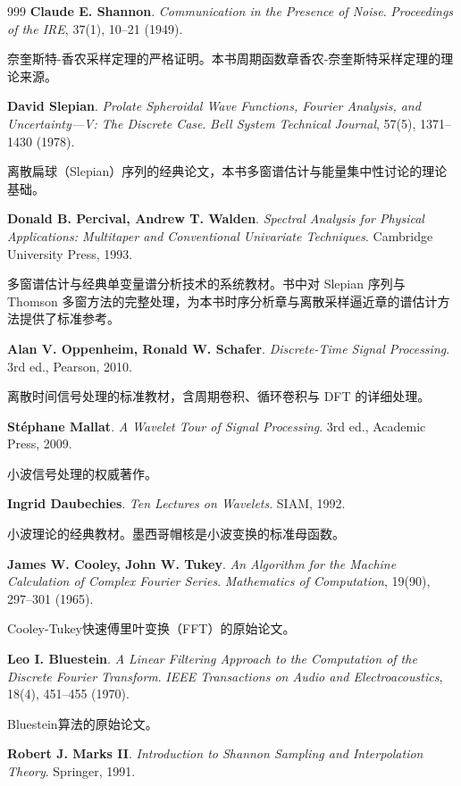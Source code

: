\begin{thebibliography}{999}
 \textbf{Claude E. Shannon}. \textit{Communication in the Presence of Noise}. \textit{Proceedings of the IRE}, 37(1), 10--21 (1949).

奈奎斯特-香农采样定理的严格证明。本书周期函数章香农-奈奎斯特采样定理的理论来源。

 \textbf{David Slepian}. \textit{Prolate Spheroidal Wave Functions, Fourier Analysis, and Uncertainty---V: The Discrete Case}. \textit{Bell System Technical Journal}, 57(5), 1371--1430 (1978).

离散扁球（Slepian）序列的经典论文，本书多窗谱估计与能量集中性讨论的理论基础。

 \textbf{Donald B. Percival, Andrew T. Walden}. \textit{Spectral Analysis for Physical Applications: Multitaper and Conventional Univariate Techniques}. Cambridge University Press, 1993.

多窗谱估计与经典单变量谱分析技术的系统教材。书中对 Slepian 序列与 Thomson 多窗方法的完整处理，为本书时序分析章与离散采样逼近章的谱估计方法提供了标准参考。

 \textbf{Alan V. Oppenheim, Ronald W. Schafer}. \textit{Discrete-Time Signal Processing}. 3rd ed., Pearson, 2010.

离散时间信号处理的标准教材，含周期卷积、循环卷积与 DFT 的详细处理。

 \textbf{St\'ephane Mallat}. \textit{A Wavelet Tour of Signal Processing}. 3rd ed., Academic Press, 2009.

小波信号处理的权威著作。

 \textbf{Ingrid Daubechies}. \textit{Ten Lectures on Wavelets}. SIAM, 1992.

小波理论的经典教材。墨西哥帽核是小波变换的标准母函数。

 \textbf{James W. Cooley, John W. Tukey}. \textit{An Algorithm for the Machine Calculation of Complex Fourier Series}. \textit{Mathematics of Computation}, 19(90), 297--301 (1965).

Cooley-Tukey快速傅里叶变换（FFT）的原始论文。

 \textbf{Leo I. Bluestein}. \textit{A Linear Filtering Approach to the Computation of the Discrete Fourier Transform}. \textit{IEEE Transactions on Audio and Electroacoustics}, 18(4), 451--455 (1970).

Bluestein算法的原始论文。

 \textbf{Robert J. Marks II}. \textit{Introduction to Shannon Sampling and Interpolation Theory}. Springer, 1991.


\end{thebibliography}
